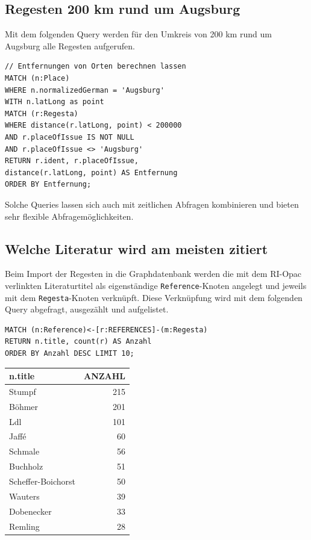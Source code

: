 \documentclass[ngerman,]{scrreprt}
\begin{document}
\hypertarget{regesten-200-km-rund-um-augsburg}{%
\subsection{Regesten 200 km rund um Augsburg}\label{regesten-200-km-rund-um-augsburg}}

Mit dem folgenden Query werden für den Umkreis von 200 km rund um Augsburg alle Regesten aufgerufen.

\begin{verbatim}
// Entfernungen von Orten berechnen lassen
MATCH (n:Place)
WHERE n.normalizedGerman = 'Augsburg'
WITH n.latLong as point
MATCH (r:Regesta)
WHERE distance(r.latLong, point) < 200000
AND r.placeOfIssue IS NOT NULL
AND r.placeOfIssue <> 'Augsburg'
RETURN r.ident, r.placeOfIssue,
distance(r.latLong, point) AS Entfernung
ORDER BY Entfernung;
\end{verbatim}

Solche Queries lassen sich auch mit zeitlichen Abfragen kombinieren und bieten sehr flexible Abfragemöglichkeiten.

\hypertarget{welche-literatur-wird-am-meisten-zitiert}{%
\subsection{Welche Literatur wird am meisten zitiert}\label{welche-literatur-wird-am-meisten-zitiert}}

Beim Import der Regesten in die Graphdatenbank werden die mit dem RI-Opac verlinkten Literaturtitel als eigenständige \texttt{Reference}-Knoten angelegt und jeweils mit dem \texttt{Regesta}-Knoten verknüpft. Diese Verknüpfung wird mit dem folgenden Query abgefragt, ausgezählt und aufgelistet.

\begin{verbatim}
MATCH (n:Reference)<-[r:REFERENCES]-(m:Regesta)
RETURN n.title, count(r) AS Anzahl
ORDER BY Anzahl DESC LIMIT 10;
\end{verbatim}

\begin{longtable}[]{@{}lr@{}}
\toprule
n.title & ANZAHL\tabularnewline
\midrule
\endhead
Stumpf & 215\tabularnewline
Böhmer & 201\tabularnewline
Ldl & 101\tabularnewline
Jaffé & 60\tabularnewline
Schmale & 56\tabularnewline
Buchholz & 51\tabularnewline
Scheffer-Boichorst & 50\tabularnewline
Wauters & 39\tabularnewline
Dobenecker & 33\tabularnewline
Remling & 28\tabularnewline
\bottomrule
\end{longtable}
\end{document}
